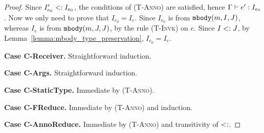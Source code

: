 \begin{proof}
Since $I'_{e_0} <: I_{e_0}$, the conditions of \textsc{(T-Anno)} are satisfied, hence $\Gamma \; {\vdash} \; e' : I_{e_0}$. Now we only need to prove that $I_{e_0} = I_e$. Since $I_{e_0}$ is from $\texttt{mbody}(m, I, J)$, whereas $I_e$ is from $\texttt{mbody}(m, J, J)$, by the rule \textsc{(T-Invk)} on $e$. Since $I <: J$, by Lemma~\ref{lemma:mbody_type_preservation}, $I_{e_0} = I_e$.

\textbf{Case C-Receiver.} Straightforward induction.


\textbf{Case C-Args.} Straightforward induction.


\textbf{Case C-StaticType.} Immediate by \textsc{(T-Anno)}.

\textbf{Case C-FReduce.} Immediate by \textsc{(T-Anno)} and induction.

\textbf{Case C-AnnoReduce.} Immediate by \textsc{(T-Anno)} and transitivity of $<:$.

\begin{comment}
\noindent \textbf{Case Invk.} 
let \[ e = \angl{J}\new I.m(\overline{\angl{I_e}}\overline{e}) \] 
Suppose \[ \mbody(m, I, J) = (J', \overline{I_x} \; \overline{x}, I_{e_0} \; e_0) \] 
then \[ e' =  [\overline{\angl{I_x}} \overline{e}/\overline{x}, \; \angl{J}\new I/\kwthis ] e_0 \] 
By rules \textsc{(T-New)} and \textsc{(T-Invk)}, 
  \[ \judgeewf \Gamma {\new I:I} \quad 
     \mtype(m, I, J) = \overline{I_x} \rightarrow I_{e_0} \quad 
     \judgeewf \Gamma {\overline{e} : \overline{I_e'}} \quad
     \overline{I_e'} \subtype \overline{I_x} \quad
     \textit{, for some } \; \overline{I_e'}
  \]
By Lemma~\ref{lemma0},
    \[
    \judgeewf {\Gamma, \overline{x}:\overline{I_x}, \kwthis:J_0} {e_0:I_f} \textit{, for some } J \subtype J_0 \textit{ and } I_f \subtype I_{e_0}
    \]
By Lemma~\ref{lemma1},
    \[
    \judgeewf {\Gamma} {[\overline{\angl{I_x}} \overline{e}/\overline{x}, \; \angl{J}\new I/\kwthis ] e_0  :  I_g} \textit{, for some } I_g \subtype I_f 
    \]
So $I_g <: I_{e_0}$, finally just let $I' = I_g$.

\noindent \textbf{Case PathInvk.}
let \[ e = \angl{J}\new I.K::m(\overline{\angl{I_e}} \overline{e}) \]  
Suppose \[ \mbody(m, I, K) = (J', \overline{I_x} \; \overline{x}, I_{e_0} \; e_0) \] 
then \[ e' =  [\overline{\angl{I_x}} \overline{e}/\overline{x}, \; \angl{K}\new I/\kwthis ] e_0 \] 
By rules \textsc{(T-New)} and \textsc{(T-Invk)}, 
  \[ \judgeewf \Gamma {\new I:I} \quad 
     \mtype(m, I, K) = \overline{I_x} \rightarrow I_{e_0} \quad 
     \judgeewf \Gamma {\overline{e} : \overline{I_e'}} \quad
     \overline{I_e'} \subtype \overline{I_x} \quad
     \textit{, for some } \; \overline{I_e'}
  \]
By Lemma~\ref{lemma0},
    \[
    \judgeewf {\Gamma, \overline{x}:\overline{I_x}, \kwthis:J_0} {e_0:I_f} \textit{, for some } K \subtype J_0 \textit{ and } I_f \subtype I_{e_0}
    \]
By Lemma~\ref{lemma1},
    \[
    \judgeewf {\Gamma} {[\overline{\angl{I_x}} \overline{e}/\overline{x}, \; \angl{K}\new I/\kwthis ] e_0  :  I_g} \textit{, for some } I_g \subtype I_f 
    \]
So $I_g <: I_{e_0}$, finally just let $I' = I_g$.


\end{comment}
\end{proof}
